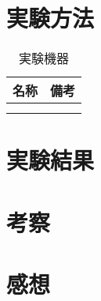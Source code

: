 \documentclass{ltjsarticle}
\begin{document}
\section{実験方法}
\begin{table}[H]
    \centering
    \begin{tabular}{|c|c|} \hline
        名称       &  備考        \\ \hline
        & \\ \hline
        & \\ \hline
    \end{tabular}
    \label{tab:devices-used}
    \caption{実験機器}
\end{table}

\section{実験結果}


\section{考察}


\section{感想}

\begin{thebibliography}{9}
\end{thebibliography}
\end{document}
